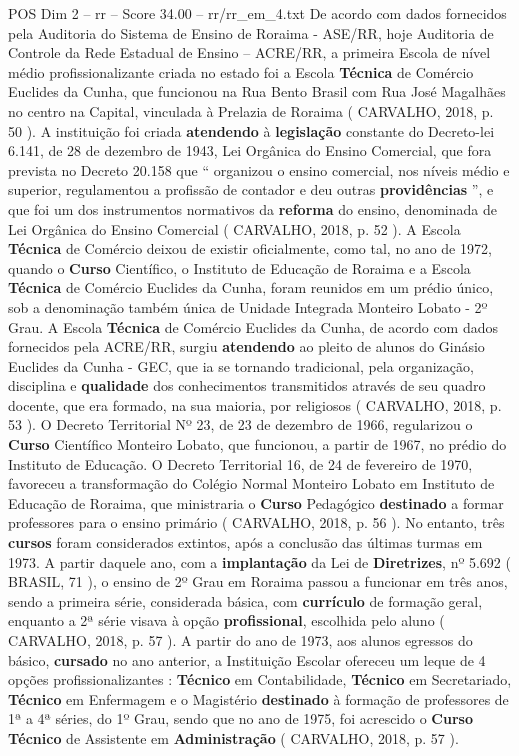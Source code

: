 \begin{textsample}{POS Dim 2 – rr – Score 34.00 – rr/rr\_em\_4.txt}
De acordo com dados fornecidos pela Auditoria do Sistema de Ensino de Roraima - ASE/RR, hoje Auditoria de Controle da Rede Estadual de Ensino – ACRE/RR, a primeira Escola de nível médio profissionalizante criada no estado foi a Escola \textbf{Técnica} de Comércio Euclides da Cunha, que funcionou na Rua Bento Brasil com Rua José Magalhães no centro na Capital, vinculada à Prelazia de Roraima ( CARVALHO, 2018, p. 50 ).
A instituição foi criada \textbf{atendendo} à \textbf{legislação} constante do Decreto-lei 6.141, de 28 de dezembro de 1943, Lei Orgânica do Ensino Comercial, que fora prevista no Decreto 20.158 que “ organizou o ensino comercial, nos níveis médio e superior, regulamentou a profissão de contador e deu outras \textbf{providências} ”, e que foi um dos instrumentos normativos da \textbf{reforma} do ensino, denominada de Lei Orgânica do Ensino Comercial ( CARVALHO, 2018, p. 52 ).
A Escola \textbf{Técnica} de Comércio deixou de existir oficialmente, como tal, no ano de 1972, quando o \textbf{Curso} Científico, o Instituto de Educação de Roraima e a Escola \textbf{Técnica} de Comércio Euclides da Cunha, foram reunidos em um prédio único, sob a denominação também única de Unidade Integrada Monteiro Lobato - 2º Grau.
A Escola \textbf{Técnica} de Comércio Euclides da Cunha, de acordo com dados fornecidos pela ACRE/RR, surgiu \textbf{atendendo} ao pleito de alunos do Ginásio Euclides da Cunha - GEC, que ia se tornando tradicional, pela organização, disciplina e \textbf{qualidade} dos conhecimentos transmitidos através de seu quadro docente, que era formado, na sua maioria, por religiosos ( CARVALHO, 2018, p. 53 ).
O Decreto Territorial Nº 23, de 23 de dezembro de 1966, regularizou o \textbf{Curso} Científico Monteiro Lobato, que funcionou, a partir de 1967, no prédio do Instituto de Educação.
O Decreto Territorial 16, de 24 de fevereiro de 1970, favoreceu a transformação do Colégio Normal Monteiro Lobato em Instituto de Educação de Roraima, que ministraria o \textbf{Curso} Pedagógico \textbf{destinado} a formar professores para o ensino primário ( CARVALHO, 2018, p. 56 ).
No entanto, três \textbf{cursos} foram considerados extintos, após a conclusão das últimas turmas em 1973.
A partir daquele ano, com a \textbf{implantação} da Lei de \textbf{Diretrizes}, nº 5.692 ( BRASIL, 71 ), o ensino de 2º Grau em Roraima passou a funcionar em três anos, sendo a primeira série, considerada básica, com \textbf{currículo} de formação geral, enquanto a 2ª série visava à opção \textbf{profissional}, escolhida pelo aluno ( CARVALHO, 2018, p. 57 ).
A partir do ano de 1973, aos alunos egressos do básico, \textbf{cursado} no ano anterior, a Instituição Escolar ofereceu um leque de 4 opções profissionalizantes : \textbf{Técnico} em Contabilidade, \textbf{Técnico} em Secretariado, \textbf{Técnico} em Enfermagem e o Magistério \textbf{destinado} à formação de professores de 1ª a 4ª séries, do 1º Grau, sendo que no ano de 1975, foi acrescido o \textbf{Curso} \textbf{Técnico} de Assistente em \textbf{Administração} ( CARVALHO, 2018, p. 57 ).

\end{textsample}
